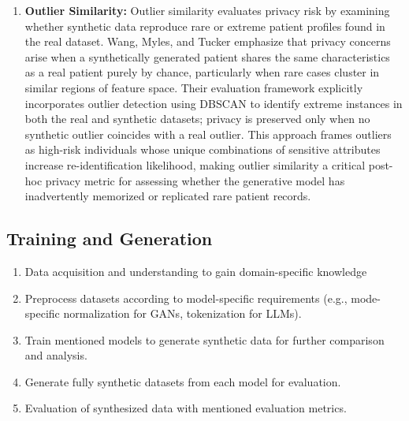 \documentclass[master,proposal,extern,palatino]{rgseThesis}
\begin{document}
\begin{enumerate}
    \item \textbf{Outlier Similarity:} Outlier similarity evaluates privacy risk by examining whether synthetic data reproduce rare or extreme patient profiles found in the real dataset. Wang, Myles, and Tucker \cite{wang2019generating} emphasize that privacy concerns arise when a synthetically generated patient shares the same characteristics as a real patient purely by chance, particularly when rare cases cluster in similar regions of feature space. Their evaluation framework explicitly incorporates outlier detection using DBSCAN to identify extreme instances in both the real and synthetic datasets; privacy is preserved only when no synthetic outlier coincides with a real outlier. This approach frames outliers as high-risk individuals whose unique combinations of sensitive attributes increase re-identification likelihood, making outlier similarity a critical post-hoc privacy metric for assessing whether the generative model has inadvertently memorized or replicated rare patient records.
\end{enumerate}


\subsection{Training and Generation}
\begin{enumerate}
    \item Data acquisition and understanding to gain domain-specific knowledge
    \item Preprocess datasets according to model-specific requirements (e.g., mode-specific normalization for GANs, tokenization for LLMs).
    \item Train mentioned models to generate synthetic data for further comparison and analysis.
    \item Generate fully synthetic datasets from each model for evaluation.
    \item Evaluation of synthesized data with mentioned evaluation metrics.
\end{enumerate}
\end{document}
